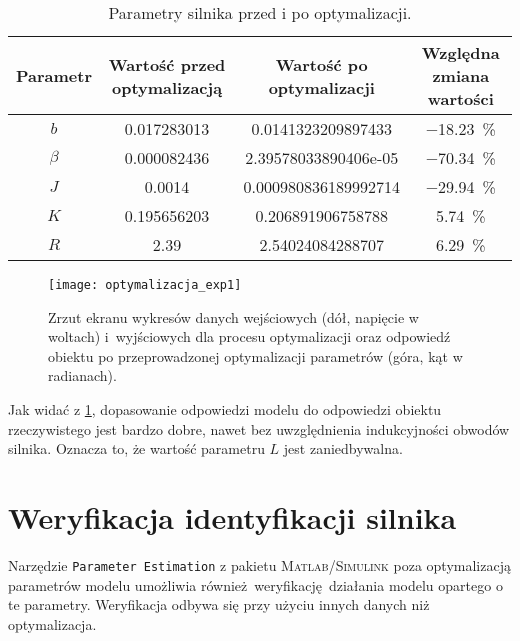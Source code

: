 \begin{table}[h]
    \centering
    \begin{threeparttable}
        \caption{Parametry silnika przed i po optymalizacji.}
        \label{tab:parametry_silnika_optymalizacja}
        
        \begin{tabular}{c | S[round-mode=places, round-precision=6] | S[round-mode=places, round-precision=6] | c}
            \toprule
            Parametr & {Wartość przed optymalizacją} & {Wartość po optymalizacji} & Względna zmiana wartości \\
            \midrule
            $b$ & 0.017283013 & 0.0141323209897433 & \SI{-18,23}{\percent} \\
            $\beta$ & 0.000082436 & 2.39578033890406e-05 & \SI{-70,34}{\percent} \\
            $J$ & 0.0014 & 0.000980836189992714 & \SI{-29,94}{\percent} \\
            $K$ & 0.195656203 & 0.206891906758788 & \SI{5,74}{\percent} \\
            $R$ & 2.39 & 2.54024084288707 & \SI{6,29}{\percent} \\
            \bottomrule
        \end{tabular}
    \end{threeparttable}
\end{table}

\begin{figure}[H]
    \centering
    \texttt{[image: optymalizacja\_exp1]}
    \caption{Zrzut ekranu wykresów danych wejściowych (dół, napięcie w woltach) i~wyjściowych dla procesu optymalizacji oraz odpowiedź obiektu po przeprowadzonej optymalizacji parametrów (góra, kąt w radianach).}
    \label{fig:silnik_oszacowanie_parametrow}
\end{figure}

Jak widać z \cref{fig:silnik_oszacowanie_parametrow}, dopasowanie odpowiedzi modelu do odpowiedzi obiektu rzeczywistego jest bardzo dobre, nawet bez uwzględnienia indukcyjności obwodów silnika. Oznacza to, że wartość parametru $L$ jest zaniedbywalna.

\section{Weryfikacja identyfikacji silnika}
\label{sec:ch5_weryfikacja_identyfikacji_silnika}

Narzędzie \texttt{Parameter Estimation} z pakietu \textsc{Matlab/Simulink} poza optymalizacją parametrów modelu umożliwia również weryfikację działania modelu opartego o te parametry. Weryfikacja odbywa się przy użyciu innych danych niż optymalizacja.


